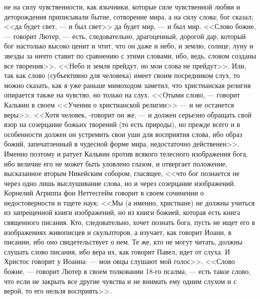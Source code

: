 \documentclass[12pt]{article}
\begin{document}
не на силу чувственности, как язычники, которые силе чувственной любви и деторождения приписывали бытие, сотворение мира, а на силу слова; бог сказал; <<да будет свет, --- и был свет>>  да будет мир, --- и был мир. <<Слово божие, --- говорит Лютер, --- есть, следовательно, драгоценный, дорогой дар, который бог настолько высоко ценит и чтит, что он даже и небо, и землю, солнце, луну и звезды за ничто ставит по сравнению с этими словами, ибо, ведь, словом созданы все творения>>. <<Небо и земля прейдут, но мои слова не прейдут>>. Или, так как слово (субъективно для человека) имеет своим посредником слух, то можно сказать, как я уже раньше мимоходом заметил, что христианская религия опирается также на чувство, но только на слух. <<Отыми слово, --- говорит Кальвин в своем <<Учении о христианской религии>>  --- и не останется веры>>. <<Хотя человек, -говорит он же, --- и должен серьезно обращать свой взор на созерцание божьих творений (то есть природы), но прежде всего и в особенности должен он устремить свои уши для восприятия слова, ибо образ божий, запечатленный в чудесной форме мира, недостаточно действенен>>. Именно поэтому и ратует Кальвин против всякого телесного изображения бога, ибо величие его не может быть уловлено глазом, и отвергает положение, высказанное вторым Никейским собором, гласящее, <<что бог познается не через одно лишь выслушивание слова, но и через созерцание изображений. Корнелий Агриппа фон Неттесгейм говорит в своем сочинении о недостоверности и тщете наук: <<Мы (а именно, христиане) не должны учиться из запрещенной книги изображений, но из книги божией, которая есть книга священного писания. Кто, следовательно, хочет познать бога, пусть не ищет его в изображениях живописцев и скульпторов, а изучает, как говорит Иоанн, в писании, ибо оно свидетельствует о нем. Те же, кто не могут читать, должны слушать слово писания, ибо вера их, как говорит Павел, идет от слуха. И Христос говорит у Иоанна: --- мои овцы слушают мой голос>>. <<Слово божие, --- говорит Лютер в своем толковании 18-го псалма, --- есть такое слово, что если не закрыть все другие чувства и не внимать ему одним слухом и с верой, то его нельзя восприять>>. 
\end{document}
